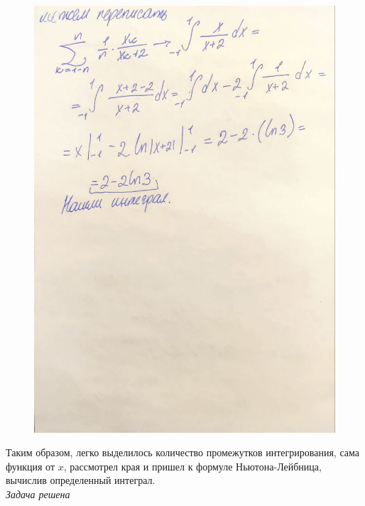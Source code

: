 \documentclass[a4paper,12pt]{article}
\begin{document}
\begin{figure}[H]
    \centering
    \includegraphics[width=0.8\linewidth]{../img/2_2.jpg}
    \caption{}
    \label{fig:part2}
\end{figure}

Таким образом, легко выделилось количество промежутков интегрирования, сама функция от $x$, рассмотрел края и пришел к формуле Ньютона-Лейбница, вычислив определенный интеграл.\\
\emph{Задача решена}
\end{document}
